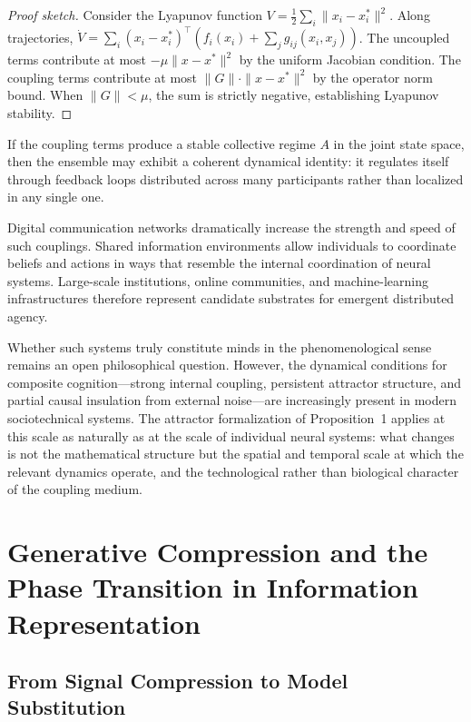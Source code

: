 \documentclass[12pt,a4paper]{article}
\theoremstyle{plain}
\theoremstyle{definition}
\begin{document}
\begin{proof}[Proof sketch]
Consider the Lyapunov function $V = \frac{1}{2}\sum_i \|x_i - x_i^*\|^2$. Along trajectories, $\dot{V} = \sum_i (x_i - x_i^*)^\top (f_i(x_i) + \sum_j g_{ij}(x_i,x_j))$. The uncoupled terms contribute at most $-\mu \|x - x^*\|^2$ by the uniform Jacobian condition. The coupling terms contribute at most $\|G\| \cdot \|x - x^*\|^2$ by the operator norm bound. When $\|G\| < \mu$, the sum is strictly negative, establishing Lyapunov stability.
\end{proof}

If the coupling terms produce a stable collective regime $A$ in the joint state space, then the ensemble may exhibit a coherent dynamical identity: it regulates itself through feedback loops distributed across many participants rather than localized in any single one.

Digital communication networks dramatically increase the strength and speed of such couplings. Shared information environments allow individuals to coordinate beliefs and actions in ways that resemble the internal coordination of neural systems. Large-scale institutions, online communities, and machine-learning infrastructures therefore represent candidate substrates for emergent distributed agency.

Whether such systems truly constitute minds in the phenomenological sense remains an open philosophical question. However, the dynamical conditions for composite cognition—strong internal coupling, persistent attractor structure, and partial causal insulation from external noise—are increasingly present in modern sociotechnical systems. The attractor formalization of Proposition~1 applies at this scale as naturally as at the scale of individual neural systems: what changes is not the mathematical structure but the spatial and temporal scale at which the relevant dynamics operate, and the technological rather than biological character of the coupling medium.

\section{Generative Compression and the Phase Transition in Information Representation}
\label{sec:compression}

\subsection{From Signal Compression to Model Substitution}
\end{document}
